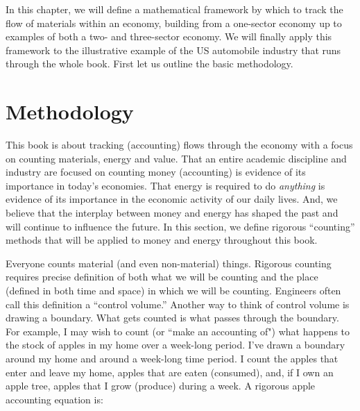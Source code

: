 In this chapter, we will define a mathematical framework by which to track the flow of
materials within an economy, building from a one-sector economy up to examples of both a
two- and three-sector economy. We will finally apply this framework to the illustrative
example of the US automobile industry that runs through the whole book. First let us
outline the basic methodology.

\section{Methodology}
\label{sec:Materials_Methodology}



This book is about tracking (accounting) flows through the 
economy with a focus on counting materials, energy and value.
That an entire academic discipline and industry are focused on counting money (accounting)
is evidence of its importance in today's economies.
That energy is required to do \emph{anything} is evidence 
of its importance in the economic activity of our daily lives.
And, we believe that the interplay between money and energy
has shaped the past and will continue to influence the future.
In this section, we define rigorous ``counting'' methods that will be applied
to money and energy throughout this book.

Everyone counts material (and even non-material) things. 
Rigorous counting requires precise definition of both 
what we will be counting
and the place (defined in both time and space) in which we will be counting. 
Engineers often call this definition a ``control volume.'' Another way to think of
control volume is drawing a boundary. What gets counted is 
what passes through the boundary.
For example, I may wish to count (or ``make an accounting of") 
what happens to the stock  of apples in my home over a week-long period. 
I've drawn a boundary around my home and around a week-long time period.
I  count the apples that enter and leave my home, 
apples that are eaten (consumed),
and, if I own an apple tree, apples that I grow (produce) during a week. 
A rigorous apple accounting equation is:

